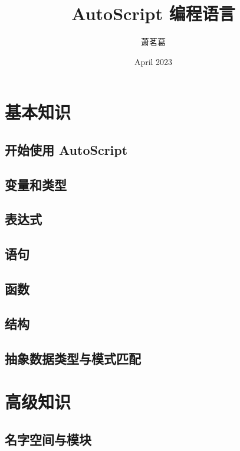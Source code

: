 \documentclass[lang=cn, scheme=chinese, 10pt]{elegantbook}
\title{AutoScript 编程语言}
\author{萧茗葛}
\date{April 2023}
\begin{document}
\maketitle
\frontmatter
\tableofcontents
\mainmatter

\part{基本知识}

\chapter{开始使用 AutoScript}


\chapter{变量和类型}


\chapter{表达式}


\chapter{语句}


\chapter{函数}


\chapter{结构}


\chapter{抽象数据类型与模式匹配}


\part{高级知识}

\chapter{名字空间与模块}

\end{document}
